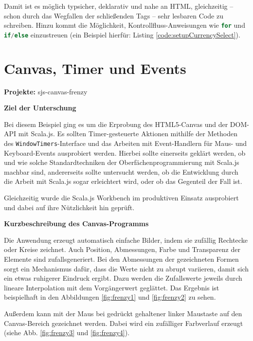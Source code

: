 \documentclass[a4paper, 12pt, hidelinks, listof=totoc, listoftables=totoc, bibliography=totoc]{scrreprt}
\newcommand{\code}[1]{\lstinline[language=Scala, style=inline]|#1|}
\newcommand{\scala}[1]{\lstinline[language=Scala, style=inline]|#1|}
\newcommand{\MyMiniSec}[1]{\rmfamily\fontsize{12}{15}\selectfont
	\vspace{7pt}\textbf{#1} %
}
\begin{document}
Damit ist es möglich typsicher, deklarativ und nahe an \ac{HTML}, gleichzeitig -- schon durch das Wegfallen der schließenden Tags -- sehr lesbaren Code zu schreiben. Hinzu kommt die Möglichkeit, Kontrollfluss-Anweisungen wie \scala{for} und \scala{if/else} einzustreuen (ein Beispiel hierfür: Listing \ref{code:setupCurrencySelect}).



\section{Canvas, Timer und Events}

\textbf{Projekte:} sjs-canvas-frenzy

\MyMiniSec{Ziel der Unterschung}

Bei diesem Beispiel ging es um die Erprobung des HTML5-Canvas und der \ac{DOM}-\ac{API} mit Scala.js. Es sollten Timer-gesteuerte Aktionen mithilfe der Methoden des \code{WindowTimers}-Interface und das Arbeiten mit Event-Handlern für Maus- und Keyboard-Events ausprobiert werden. Hierbei sollte einerseits geklärt werden, ob und wie solche Standardtechniken der Oberfächenprogrammierung mit Scala.js machbar sind, andererseits sollte untersucht werden, ob die Entwicklung durch die Arbeit mit Scala.js sogar erleichtert wird, oder ob das Gegenteil der Fall ist.

Gleichzeitig wurde die Scala.js Workbench im produktiven Einsatz ausprobiert und dabei auf ihre Nützlichkeit hin geprüft.


\MyMiniSec{Kurzbeschreibung des Canvas-Programms}

Die Anwendung erzeugt automatisch einfache Bilder, indem sie zufällig Rechtecke oder Kreise zeichnet. Auch Position, Abmessungen, Farbe und Transparenz der Elemente sind zufallsgeneriert. Bei den Abmessungen der gezeichneten Formen sorgt ein Mechanismus dafür, dass die Werte nicht zu abrupt variieren, damit sich ein etwas ruhigerer Eindruck ergibt. Dazu werden die Zufallswerte jeweils durch lineare Interpolation mit dem Vorgängerwert geglättet. Das Ergebnis ist beispielhaft in den Abbildungen \ref{fig:frenzy1} und \ref{fig:frenzy2} zu sehen.

Außerdem kann mit der Maus bei gedrückt gehaltener linker Maustaste auf den Canvas-Bereich gezeichnet werden. Dabei wird ein zufälliger Farbverlauf erzeugt (siehe Abb. \ref{fig:frenzy3} und \ref{fig:frenzy4}).
\end{document}
